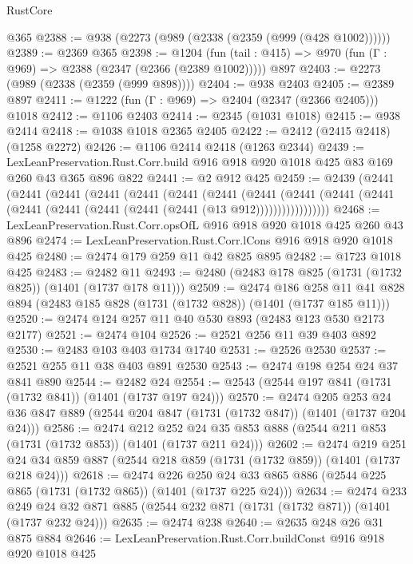 \begin{lexlean}{RustCore}
\begin{coremodule}
    @365
@2388 := @938 (@2273 (@989 (@2338 (@2359 (@999 (@428 @1002))))))
@2389 := @2369 @365
@2398 := @1204
    (fun (tail : @415) => @970 (fun (Γ : @969) => @2388 (@2347 (@2366 (@2389 @1002)))))
    @897
@2403 := @2273 (@989 (@2338 (@2359 (@999 @898))))
@2404 := @938 @2403
@2405 := @2389 @897
@2411 := @1222 (fun (Γ : @969) => @2404 (@2347 (@2366 @2405))) @1018
@2412 := @1106 @2403
@2414 := @2345 (@1031 @1018)
@2415 := @938 @2414
@2418 := @1038 @1018 @2365 @2405
@2422 := @2412 (@2415 @2418) (@1258 @2272)
@2426 := @1106 @2414 @2418 (@1263 @2344)
@2439 := LexLeanPreservation.Rust.Corr.build
    @916
    @918
    @920
    @1018
    @425
    @83
    @169
    @260
    @43
    @365
    @896
    @822
@2441 := @2 @912 @425
@2459 := @2439
    (@2441
      (@2441
        (@2441
          (@2441
            (@2441
              (@2441
                (@2441
                  (@2441
                    (@2441
                      (@2441 (@2441 (@2441 (@2441 (@2441 (@2441 (@2441 (@13 @912)))))))))))))))))
@2468 := LexLeanPreservation.Rust.Corr.opsOfL @916 @918 @920 @1018 @425 @260 @43 @896
@2474 := LexLeanPreservation.Rust.Corr.lCons @916 @918 @920 @1018 @425
@2480 := @2474 @179 @259 @11 @42 @825 @895
@2482 := @1723 @1018 @425
@2483 := @2482 @11
@2493 := @2480 (@2483 @178 @825 (@1731 (@1732 @825)) (@1401 (@1737 @178 @11)))
@2509 := @2474
    @186
    @258
    @11
    @41
    @828
    @894
    (@2483 @185 @828 (@1731 (@1732 @828)) (@1401 (@1737 @185 @11)))
@2520 := @2474 @124 @257 @11 @40 @530 @893 (@2483 @123 @530 @2173 @2177)
@2521 := @2474 @104
@2526 := @2521 @256 @11 @39 @403 @892
@2530 := @2483 @103 @403 @1734 @1740
@2531 := @2526 @2530
@2537 := @2521 @255 @11 @38 @403 @891 @2530
@2543 := @2474 @198 @254 @24 @37 @841 @890
@2544 := @2482 @24
@2554 := @2543 (@2544 @197 @841 (@1731 (@1732 @841)) (@1401 (@1737 @197 @24)))
@2570 := @2474
    @205
    @253
    @24
    @36
    @847
    @889
    (@2544 @204 @847 (@1731 (@1732 @847)) (@1401 (@1737 @204 @24)))
@2586 := @2474
    @212
    @252
    @24
    @35
    @853
    @888
    (@2544 @211 @853 (@1731 (@1732 @853)) (@1401 (@1737 @211 @24)))
@2602 := @2474
    @219
    @251
    @24
    @34
    @859
    @887
    (@2544 @218 @859 (@1731 (@1732 @859)) (@1401 (@1737 @218 @24)))
@2618 := @2474
    @226
    @250
    @24
    @33
    @865
    @886
    (@2544 @225 @865 (@1731 (@1732 @865)) (@1401 (@1737 @225 @24)))
@2634 := @2474
    @233
    @249
    @24
    @32
    @871
    @885
    (@2544 @232 @871 (@1731 (@1732 @871)) (@1401 (@1737 @232 @24)))
@2635 := @2474 @238
@2640 := @2635 @248 @26 @31 @875 @884
@2646 := LexLeanPreservation.Rust.Corr.buildConst @916 @918 @920 @1018 @425

\end{coremodule}
\end{lexlean}
